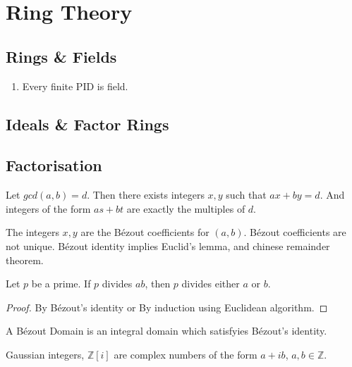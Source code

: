 \chapter{Ring Theory}

\section{Rings \& Fields}
\begin{enumerate}
	\item Every finite PID is field.
\end{enumerate}

\section{Ideals \& Factor Rings}

\section{Factorisation}
\begin{lemma}[B\'ezout]
	Let $gcd(a,b) = d$. Then there exists integers $x,y$ such that $ax+by = d$. And integers of the form $as+bt$ are exactly the multiples of $d$.
\end{lemma}

	The integers $x,y$ are the B\'ezout coefficients for $(a,b)$. B\'ezout coefficients are not unique.
	B\'ezout identity implies Euclid's lemma, and chinese remainder theorem.

\begin{lemma}[Euclid]
	Let $p$ be a prime. If $p$ divides $ab$, then $p$ divides either $a$ or $b$.
\end{lemma}
\begin{proof}
	By B\'ezout's identity or By induction using Euclidean algorithm.
\end{proof}

\begin{theorem}

\end{theorem}

\begin{definition}
	A B\'ezout Domain is an integral domain which satisfyies B\'ezout's identity.
\end{definition}

\begin{definition}
	Gaussian integers, $\mathbb{Z}[i]$ are complex numbers of the form $a+ib$, $a,b \in \mathbb{Z}$.
\end{definition}

